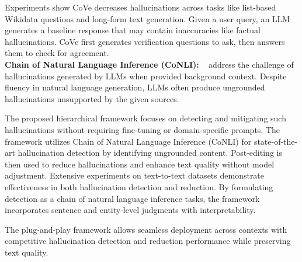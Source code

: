 \documentclass[11pt]{article}
\begin{document}
Experiments show CoVe decreases hallucinations across tasks like list-based Wikidata questions and long-form text generation. Given a user query, an LLM generates a baseline response that may contain inaccuracies like factual hallucinations. CoVe first generates verification questions to ask, then answers them to check for agreement.
 \\
\textbf{Chain of Natural Language Inference (CoNLI):} ~\cite{lei2023chain} address the challenge of hallucinations generated by LLMs when provided background context. Despite fluency in natural language generation, LLMs often produce ungrounded hallucinations unsupported by the given sources.

The proposed hierarchical framework focuses on detecting and mitigating such hallucinations without requiring fine-tuning or domain-specific prompts. The framework utilizes Chain of Natural Language Inference (CoNLI) for state-of-the-art hallucination detection by identifying ungrounded content. Post-editing is then used to reduce hallucinations and enhance text quality without model adjustment. Extensive experiments on text-to-text datasets demonstrate effectiveness in both hallucination detection and reduction. By formulating detection as a chain of natural language inference tasks, the framework incorporates sentence and entity-level judgments with interpretability.

The plug-and-play framework allows seamless deployment across contexts with competitive hallucination detection and reduction performance while preserving text quality. 
\end{document}
